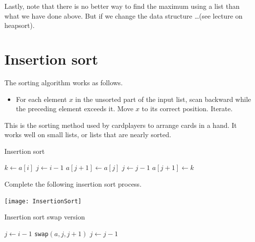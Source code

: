 Lastly, note that there is no better way to find the maximum using a list than what we have done above. 
But if we change the data structure \dots (see lecture on heapsort).



\chapter{Insertion sort} %
\label{sec:insertionsort}
The sorting algorithm  works as follows.
\begin{itemize}
	\item  For each element $x$ in the unsorted part of the input list, scan backward while the preceding element 
	exceeds it. Move $x$ to its correct position. Iterate.
\end{itemize}
This is the sorting method used by cardplayers to arrange cards in a hand.
It works well on small lists, or lists that are nearly sorted.

\begin{algorithm}[H]
  \caption{Insertion sort
    \label{alg:insort}}
\begin{algorithmic}[1]
\State $k \gets a[i]$ 
\State $j \gets i - 1$
\State {}
\State $a[j+1] \gets a[j]$
\State $j \gets j - 1$
\EndWhile
\State $a[j+1] \gets k$ 
\EndFor
\State {}
\EndFunction  
\end{algorithmic}
\end{algorithm}

\begin{Boxample}[0]
Complete the following insertion sort process.
\begin{center}
\texttt{[image: InsertionSort]}
\end{center}
\end{Boxample}

\begin{algorithm}[H]
  \caption{Insertion sort swap version
    \label{alg:insort2}}
\begin{algorithmic}[1]
\State $j \gets i - 1$
\State {}
\State \texttt{swap}$(a,j,j+1)$
\State $j \gets j - 1$
\EndWhile
\EndFor
\State {}
\EndFunction  
\end{algorithmic}
\end{algorithm}

